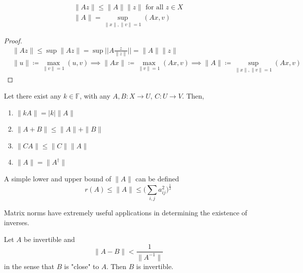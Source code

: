   \begin{theorem}
    \label{thm:submultiplicativity-of-the-operator-norm}
    \begin{align}
      \|A z\| \leq \|A\| \|z\| \text{ for all } z \in X \\
      \|A\| = \sup_{\|x\|, \|v\| = 1} (A x, v)
    \end{align}
  \end{theorem}
  \begin{proof}
    \begin{align*}
      &\|A z\| \leq \sup{\|A z\|} = \sup{\Big|\Big| A \frac{z}{\|z\|} \Big|\Big|} = \|A\| \|z\| \\
      &\|u\| \coloneqq \max_{\|v\|=1} (u, v) \implies \|A x\| \coloneqq \max_{\|v\|=1} (Ax, v) \implies \|A\| \coloneqq \sup_{\|x\|, \|v\| =1} (A x, v)
    \end{align*}
  \end{proof}

  \begin{theorem}
    \label{thm:properties-of-matrix-norm}
    Let there exist any $k \in \mathbb{F}$, with any $A, B: X \to U$, $C: U \to V$. Then, 
    \begin{enumerate}
      \item $\|k A\| = |k| \|A\|$
      \item $\|A + B\| \leq \|A\| + \|B\|$
      \item $\|C A\| \leq \|C\| \|A\|$
      \item $\|A\| = \|A^\dagger\|$
    \end{enumerate}
  \end{theorem}

  \begin{theorem}
    \label{thm:spectral-radius-bounds-the-operator-norm}
    A simple lower and upper bound of $\|A\|$ can be defined
    \begin{equation}
      r(A) \leq \|A\| \leq \bigg( \sum_{i, j} a_{i j}^2 \bigg)^\frac{1}{2}
    \end{equation}
  \end{theorem}

  Matrix norms have extremely useful applications in determining the existence of inverses. 

  \begin{theorem}
    \label{thm:invertibility-is-an-open-condition}
    Let $A$ be invertible and 
    \begin{equation}
      \|A - B\| < \frac{1}{\|A^{-1}\|}
    \end{equation}
    in the sense that $B$ is "close" to $A$. Then $B$ is invertible. 
  \end{theorem}


